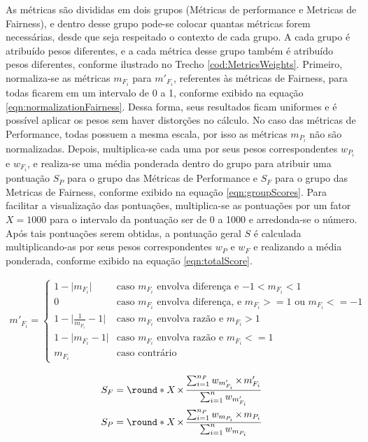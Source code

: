 \documentclass[portugues]{ic-tese}
\DeclarePairedDelimiter{\round}\lfloor\rceil
\let\oldtimes\times
\def\times{{\mkern1mu\oldtimes\mkern1mu}}
\begin{document}
As métricas são divididas em dois grupos (Métricas de performance e Metricas de Fairness), e dentro desse grupo pode-se colocar quantas métricas forem necessárias, desde que seja respeitado o contexto de cada grupo. A cada grupo é atribuído pesos diferentes, e a cada métrica desse grupo também é atribuído pesos diferentes, conforme ilustrado no Trecho \ref{cod:MetricsWeights}. Primeiro, normaliza-se as métricas $m_{F_i}$ para $m'_{F_i}$, referentes às métricas de Fairness, para todas ficarem em um intervalo de 0 a 1, conforme exibido na equação \ref{eqn:normalizationFairness}. Dessa forma, seus resultados ficam uniformes e é possível aplicar os pesos sem haver distorções no cálculo. No caso das métricas de Performance, todas possuem a mesma escala, por isso as métricas $m_{P_i}$ não são normalizadas. Depois, multiplica-se cada uma por seus pesos correspondentes $w_{P_i}$ e $w_{F_i}$, e realiza-se uma média ponderada dentro do grupo para atribuir uma pontuação $S_P$ para o grupo das Métricas de Performance e $S_F$ para o grupo das Metricas de Fairness, conforme exibido na equação \ref{eqn:groupScores}. Para facilitar a visualização das pontuações, multiplica-se as pontuações por um fator $X = 1000$ para o intervalo da pontuação ser de 0 a 1000 e arredonda-se o número. Após tais pontuações serem obtidas, a pontuação geral $S$ é calculada multiplicando-as por seus pesos correspondentes $w_P$ e $w_F$ e realizando a média ponderada, conforme exibido na equação \ref{eqn:totalScore}.

\begin{equation}
\label{eqn:normalizationFairness}
	\begin{aligned}
	m'_{F_i} = 
	\begin{cases}
	1-\lvert m_{F_i} \rvert & \text{caso $m_{F_i}$ envolva diferen\c{c}a e $-1 < m_{F_i} < 1$}\\
	0 & \text{caso $m_{F_i}$ envolva diferen\c{c}a, e $m_{F_i} >= 1$ ou $m_{F_i} <= -1$}\\
	1-\lvert \frac{1}{m_{F_i}}-1 \lvert & \text{caso $m_{F_i}$ envolva razão e $m_{F_i} > 1$}\\
	1-\lvert m_{F_i}-1 \lvert & \text{caso $m_{F_i}$ envolva razão e $m_{F_i} <= 1$}\\
	m_{F_i} & \text{caso contrário}
	\end{cases}
	\end{aligned}
\end{equation}

\begin{equation}
\label{eqn:groupScores}
	\begin{aligned}
	S_F = \round*{X \times \frac{\sum_{i=1}^{n_F} w_{m'_{F_i}} \times m'_{F_i}}{\sum_{i=1}^{n} w_{m'_{F_i}}}}\\
	S_P = \round*{X \times \frac{\sum_{i=1}^{n_P} w_{m_{P_i}} \times m_{P_i}}{\sum_{i=1}^{n} w_{m_{P_i}}}}
	\end{aligned}
\end{equation}
\end{document}
